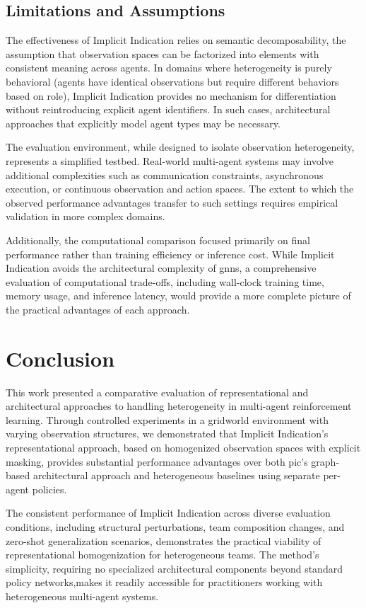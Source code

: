 \documentclass[conference]{IEEEtran}
\begin{document}
\subsection{Limitations and Assumptions}

The effectiveness of Implicit Indication relies on semantic decomposability, 
the assumption that observation spaces can be factorized into elements 
with consistent meaning across agents. In domains where heterogeneity is 
purely behavioral (agents have identical observations but require 
different behaviors based on role), Implicit Indication provides no 
mechanism for differentiation without reintroducing explicit agent identifiers. 
In such cases, architectural approaches that explicitly model agent types 
may be necessary.

The evaluation environment, while designed to isolate observation 
heterogeneity, represents a simplified testbed. Real-world multi-agent systems 
may involve additional complexities such as communication constraints, 
asynchronous execution, or continuous observation and action spaces. 
The extent to which the observed performance advantages transfer to 
such settings requires empirical validation in more complex domains.

Additionally, the computational comparison focused primarily on final 
performance rather than training efficiency or inference cost. 
While Implicit Indication avoids the architectural complexity of 
\glspl{gnn}, a comprehensive evaluation of computational trade-offs, 
including wall-clock training time, memory usage, and inference latency, 
would provide a more complete picture of the practical advantages of 
each approach.

\section{Conclusion}

This work presented a comparative evaluation of representational and architectural 
approaches to handling heterogeneity in multi-agent reinforcement learning. 
Through controlled experiments in a gridworld environment with varying observation 
structures, we demonstrated that Implicit Indication's representational approach, 
based on homogenized observation spaces with explicit masking, provides substantial 
performance advantages over both \gls{pic}'s graph-based architectural approach 
and heterogeneous baselines using separate per-agent policies.

The consistent performance of Implicit Indication across diverse evaluation 
conditions, including structural perturbations, team composition changes, 
and zero-shot generalization scenarios, demonstrates the practical 
viability of representational homogenization for heterogeneous teams. 
The method's simplicity, requiring no specialized architectural components 
beyond standard policy networks,makes it readily accessible for practitioners 
working with heterogeneous multi-agent systems.
\end{document}
